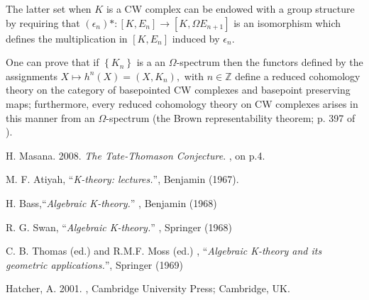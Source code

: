 \documentclass[12pt]{article}
\theoremstyle{plain}
\theoremstyle{definition}
\numberwithin{equation}{section}
\begin{document}
 The latter set when $K$ is a CW complex can be endowed with a group structure by requiring that 
$(\epsilon_n)* : [K, E_n] \to [K, \Omega E_{n+1}]$ is an isomorphism which defines the multiplication
in $[K, E_n]$ induced by $\epsilon_n$.

 One can prove that if $\left\{ K_n\right\}$ is a an $\Omega$-spectrum then the functors 
defined by the assignments $X \longmapsto h^n(X) = (X,K_n),$
with $n \in \mathbb{Z}$ define a reduced cohomology theory on the category of basepointed CW complexes and basepoint preserving maps; furthermore, every reduced cohomology theory on CW complexes arises in this manner from an $\Omega$-spectrum (the Brown representability theorem; p. 397 of \cite{AllenHatcher2k1}). 


\begin{thebibliography}{9}

H. Masana. 2008. {\em The Tate-Thomason Conjecture}. 
 , on p.4.

M. F. Atiyah, ``{\em K-theory: lectures.}'', Benjamin (1967).

H. Bass,``{\em Algebraic K-theory.}'' , Benjamin (1968) 

R. G. Swan, ``{\em Algebraic K-theory.}'' , Springer (1968) 

C. B. Thomas (ed.) and R.M.F. Moss (ed.) , ``{\em Algebraic K-theory and its geometric applications.}'', Springer  (1969) 

Hatcher, A. 2001. , Cambridge University Press; Cambridge, UK.

\end{thebibliography}

\end{document}
